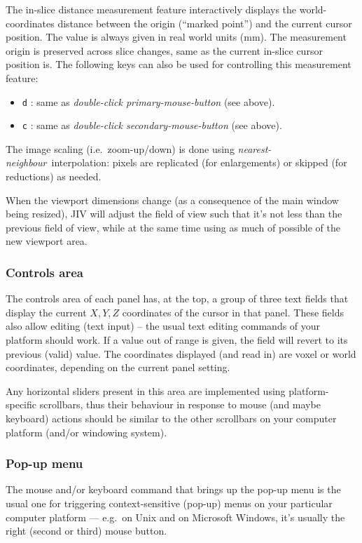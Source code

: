 The in-slice distance measurement feature interactively displays the
world-coordinates distance between the origin (``marked point'') and
the current cursor position.  The value is always given in real world
units (mm). The measurement origin is preserved across slice changes,
same as the current in-slice cursor position is.  The following keys
can also be used for controlling this measurement feature:
\begin{itemize}
\item \verb+d+ : same as {\em double-click primary-mouse-button} (see
  above). 
\item \verb+c+ : same as {\em double-click secondary-mouse-button}
  (see above).
\end{itemize}

The image scaling (i.e.\ zoom-up/down) is done using {\em
  nearest-neighbour}\ interpolation: pixels are replicated (for
enlargements) or skipped (for reductions) as needed.

When the viewport dimensions change (as a consequence of the main
window being resized), JIV will adjust the field of view such that
it's not less than the previous field of view, while at the same time
using as much of possible of the new viewport area.

\subsubsection{Controls area}
The controls area of each panel has, at the top, a group of three text
fields that display the current $X,Y,Z$ coordinates of the cursor in
that panel. These fields also allow editing (text input) -- the usual
text editing commands of your platform should work.  If a value out of
range is given, the field will revert to its previous (valid) value.
The coordinates displayed (and read in) are voxel or world
coordinates, depending on the current panel setting.

Any horizontal sliders present in this area are implemented using
platform-specific scrollbars, thus their behaviour in response to
mouse (and maybe keyboard) actions should be similar to the other
scrollbars on your computer platform (and/or windowing system).

\subsubsection{Pop-up menu}
The mouse and/or keyboard command that brings up the pop-up menu is the
usual one for triggering context-sensitive (pop-up) menus on your
particular computer platform --- e.g.\ on Unix and on Microsoft
Windows, it's usually the right (second or third) mouse button.


